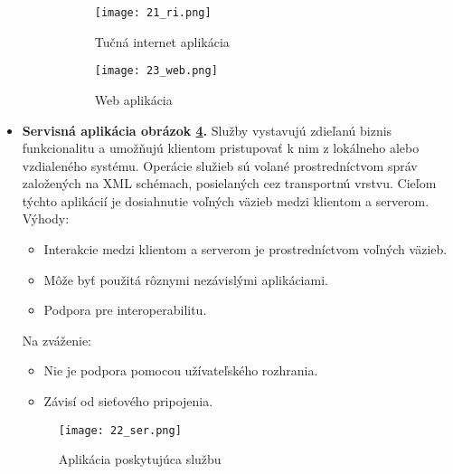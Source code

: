 \begin{itemize}
\begin{figure}[!htbp]
\centering
\begin{subfigure}{0.5\linewidth}
\texttt{[image: 21\_ri.png]}
\caption{Tučná internet aplikácia \cite{IOT03}}
\label{21_ri}
\end{subfigure}%
\begin{subfigure}{0.5\linewidth}
\texttt{[image: 23\_web.png]}
\caption{Web aplikácia \cite{IOT03}}
\label{23_web}
\end{subfigure}
\caption{}
\end{figure}

 \item
  \textbf{Servisná aplikácia obrázok \ref{22_ser}.} Služby vystavujú zdieľanú biznis funkcionalitu a umožňujú klientom pristupovať k nim z lokálneho alebo vzdialeného systému. Operácie služieb sú volané prostredníctvom správ založených na XML schémach, posielaných cez transportnú vrstvu. Cieľom týchto aplikácií je dosiahnutie voľných väzieb medzi klientom a serverom. \\
Výhody: 
 \begin{itemize}
   \item Interakcie medzi klientom a serverom je prostredníctvom voľných väzieb.
   \item Môže byť použitá rôznymi nezávislými aplikáciami.
   \item Podpora pre interoperabilitu.
 \end{itemize}
Na zváženie: 
 \begin{itemize}
   \item Nie je podpora pomocou užívateľského rozhrania.
   \item Závisí od sieťového pripojenia.
 \end{itemize} 

\begin{figure}[!htbp]
\centering
\texttt{[image: 22\_ser.png]}
\caption{Aplikácia poskytujúca službu \cite{IOT03}}
\label{22_ser}
\end{figure} 
    
\end{itemize}
